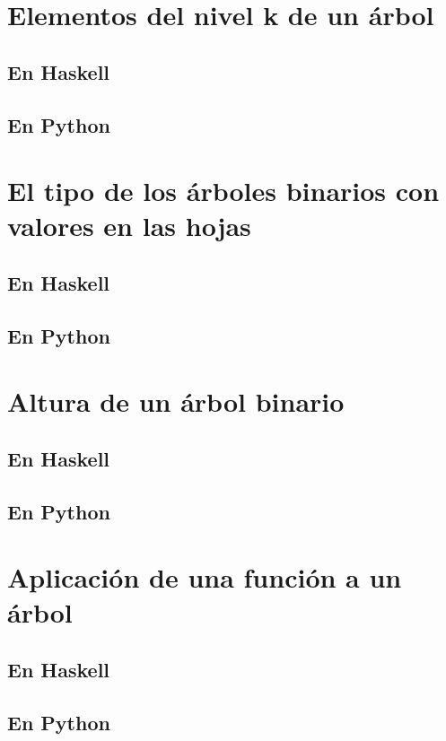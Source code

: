 \documentclass[a4paper,12pt,twoside]{book}
\begin{document}
\section{Elementos del nivel k de un árbol}
\subsection{En Haskell}
\subsection{En Python}

\section{El tipo de los árboles binarios con valores en las hojas}
\subsection{En Haskell}
\subsection{En Python}

\section{Altura de un árbol binario}
\subsection*{En Haskell}
\subsection*{En Python}

\section{Aplicación de una función a un árbol}
\subsection*{En Haskell}
\subsection*{En Python}
\end{document}
